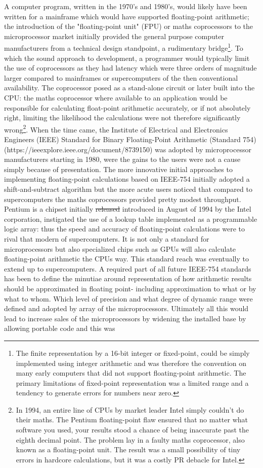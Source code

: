 \documentclass[7pt]{article}
\begin{document}
A computer program, written in the 1970's and 1980's, would likely have been written for a mainframe which would have supported floating-point arithmetic; the introduction of the "floating-point unit" (FPU) or maths coprocessors to the microprocessor market initially provided the general purpose computer manufacturers from a technical design standpoint, a rudimentary bridge\footnote{The finite representation by a 16-bit integer or fixed-point, could be simply implemented using integer arithmetic and was therefore the convention on many early computers that did not support floating-point arithmetic. The primary limitations of fixed-point representation was a limited range and a tendency to generate errors for numbers near zero.}. To which the sound approach to development, a programmer would typically limit the use of coprocessors as they had latency which were three orders of magnitude larger compared to mainframes or supercomputers of the then conventional availability. The coprocessor posed as a stand-alone circuit or later built into the CPU: the maths coprocessor where available to an application would be responsible for calculating float-point arithmetic accurately, or if not absolutely right, limiting the likelihood the calculations were not therefore significantly wrong\footnote{In 1994, an entire line of CPUs by market leader Intel simply couldn't do their maths. The Pentium floating-point flaw ensured that no matter what software you used, your results stood a chance of being inaccurate past the eighth decimal point. The problem lay in a faulty maths coprocessor, also known as a floating-point unit. The result was a small possibility of tiny errors in hardcore calculations, but it was a costly PR debacle for Intel.}.  When the time came, the Institute of Electrical and Electronics Engineers (IEEE) Standard for Binary Floating-Point Arithmetic (Standard 754) (https://ieeexplore.ieee.org/document/8739150) was adopted by microprocessor manufacturers starting in 1980, were the gains to the users were not a cause simply because of presentation. The more innovative initial approaches to implementing floating-point calculations based on IEEE-754 initially adopted a shift-and-subtract algorithm but the more acute users noticed that compared to supercomputers the maths coprocessors provided pretty modest throughput. Pentium is a chipset initially \st{released} introduced in August of 1994 by the Intel corporation, instigated the use of a lookup table implemented as a programmable logic array: thus the speed and accuracy of floating-point calculations were to rival that modern of supercomputers. It is not only a standard for microprocessors but also specialized chips such as GPUs will also calculate floating-point arithmetic the CPUs way. This standard reach was eventually to extend up to supercomputers. A required part of all future IEEE-754 standards has been to define the minutiae around representation of how arithmetic results should be approximated in floating point- including approximation to what or by what to whom. Which level of precision and what degree of dynamic range were defined and adopted by array of the microprocessors. Ultimately all this would lead to increase sales of the microprocessors by widening the installed base by allowing portable code and this was 
\end{document}
